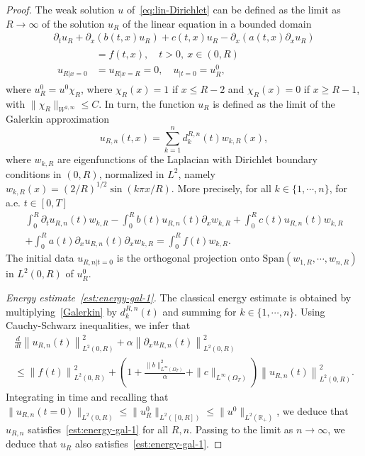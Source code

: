 \documentclass[10pt]{amsart}
\theoremstyle{definition}\newtheorem{defi}[theo]{Definition}\newtheorem{rema}[theo]{Remark}\newtheorem{exam}[theo]{Example}\newtheorem{exem}[theo]{Example}\newtheorem{nota}[theo]{Notation}
\newcommand{\R}{\mathbb{R}}
\newcommand{\p}{\partial}
\newcommand{\Span}{\mathrm{Span}}
\begin{document}
\begin{proof}
The weak solution $u$ of~\eqref{eq:lin-Dirichlet} can be defined as the limit as $R\to \infty$ of the solution $u_R$ of the linear equation in a bounded domain
\begin{multline}\label{eq:uR}
\p_t u_R +\p_x(b(t,x) u_R)+ c(t,x) u_R -\p_{x}(a(t,x) \p_x u_R)\\
\begin{aligned}
&=f(t,x),\quad t>0, \ x\in (0,R)\\
u_{R|x=0} &=u_{R|x=R}=0,\quad u_{|t=0}=u^0_R,
\end{aligned}
\end{multline}
where $u^0_R=u^0 \chi_R$, where $\chi_R(x)=1$ if $x\leq R-2$ and $\chi_R(x)=0$ if $x\geq R-1$, with $\|\chi_R\|_{W^{2,\infty}}\leq C$. In turn, the function $u_R$ is defined as the limit of the Galerkin approximation
\[
u_{R,n}(t,x)=\sum_{k=1}^n d^{R,n}_k(t) w_{k,R}(x),
\]
where $w_{k,R}$ are eigenfunctions of the Laplacian with Dirichlet boundary conditions in $(0,R)$, normalized in $L^2$, namely $w_{k,R}(x)= (2/R)^{1/2} \sin (k\pi x/R)$. More precisely, for all $k\in \{1,\cdots,n\} $, for a.e. $t\in [0,T]$
\begin{multline}\label{Galerkin}
\int_0^R\p_t u_{R,n}(t)w_{k,R} - \int_0^R b(t)u_{R,n}(t) \p_x w_{k,R} + \int_0^R c(t)u_{R,n}(t) w_{k,R}
\\ + \int_0^R a(t) \p_x u_{R,n}(t) \p_x w_{k,R} =\int_0^R f(t) w_{k,R}.
\end{multline}
The initial data $u_{R,n|t=0}$ is the orthogonal projection onto $\Span (w_{1,R},\cdots, w_{n,R})$ in $L^2(0,R)$ of $u_R^0$.

\emph{Energy estimate~\eqref{est:energy-gal-1}.}
The classical energy estimate is obtained by multiplying~\eqref{Galerkin} by $d^{R,n}_k(t)$ and summing for $k\in \{1,\cdots, n\}$. Using Cauchy-Schwarz inequalities, we infer that
\begin{multline}
\frac{d}{dt}\left\| u_{R,n}(t)\right\|_{L^2(0,R)}^2 + \alpha \left\| \p_x u_{R,n}(t)\right\|_{L^2(0,R)}^2 \\
\leq \left\|f(t)\right\|_{L^2(0,R)}^2 + \left(1 + \frac{\|b\|_{L^\infty(\Omega_T)}^2}{\alpha} + \|c\|_{L^\infty(\Omega_T)}\right) \left\| u_{R,n}(t)\right\|_{L^2(0,R)}^2.
\end{multline}
Integrating in time and recalling that $\| u_{R,n}(t=0)\|_{L^2(0,R)} \leq \| u_R^0\|_{L^2([0,R])}\leq \| u^0\|_{L^2(\R_+)}$, we deduce that $u_{R,n}$ satisfies~\eqref{est:energy-gal-1} for all $R,n$. Passing to the limit as $n\to \infty$, we deduce that $u_R$ also satisfies~\eqref{est:energy-gal-1}.


\end{proof}
\end{document}
